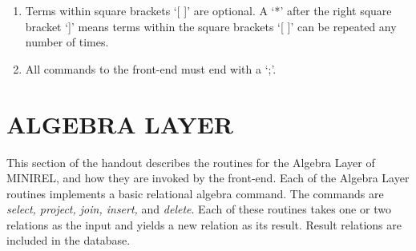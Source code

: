 \begin{enumerate}
\item Terms within square brackets `[ ]' are optional. A `*' after the right
square bracket `]' means terms within the square brackets `[ ]' can be
repeated any number of times.

\item All commands to the front-end must end with a `;'.
\end{enumerate}


\section{ALGEBRA LAYER}
This section of the handout describes the routines for the Algebra
Layer of MINIREL, and how they are invoked by the front-end.  Each of
the Algebra Layer routines implements a basic relational algebra
command.  The commands are \emph{select, project, join, insert,} and
\emph{delete}.  Each of these routines takes one or two relations as
the input and yields a new relation as its result.  Result relations are
included in the database.

